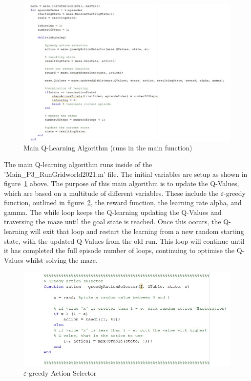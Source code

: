 \documentclass [11pt]{article}
\begin{document}
\begin{figure}[H]
\centerline{\includegraphics[width=15cm]{Q-learning-implementation}}
\caption{Main Q-Learning Algorithm (runs in the main function)}
\label{fig:q-learing}
\end{figure}

The main Q-learning algorithm runs inside of the 'Main\_P3\_RunGridworld2021.m' file. The initial variables are setup as shown in figure~\ref{fig:q-learing} above. The purpose of this main algorithm is to update the Q-Values, which are based on a multitude of different variables. These include the $\varepsilon$-greedy function, outlined in figure~\ref{fig:e-greedy_function}, the reward function, the learning rate alpha, and gamma. The while loop keeps the Q-learning updating the Q-Values and traversing the maze until the goal state is reached. Once this occurs, the Q-learning will exit that loop and restart the learning from a new random starting state, with the updated Q-Values from the old run. This loop will continue until it has completed the full episode number of loops, continuing to optimise the Q-Values whilst solving the maze. 

\begin{figure}[H]
\centerline{\includegraphics[width=15cm]{greedy_action}}
\caption{$\varepsilon$-greedy Action Selector}
\label{fig:e-greedy_function}
\end{figure}
\end{document}
